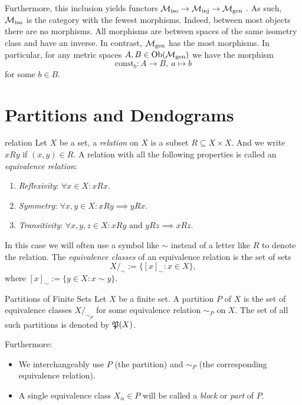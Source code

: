 Furthermore, this inclusion yields functors $\iso \to \inj \to \gen$ \cite[Def.~1.2.18]{Leinster2014-dc}.
As such, $\iso$ is the category with the fewest morphisms. Indeed, between most objects there are no morphisms.
All morphisms are between spaces of the same isometry class and have an inverse.
In contrast, $\gen$ has the most morphisms. In particular, for any metric spaces $A,B \in \ob(\gen)$ we have the morphism
$$
\mathrm{const}_b: A \to B, \ a \mapsto b
$$
for some $b \in B$.

\section{Partitions and Dendograms}
\label{section__partitions}

\begin{definition}{}{relation}
    Let $X$ be a set, a \emph{relation} on $X$ is a subset $R \subseteq X \times X$. And we write $x R y$ if $(x,y) \in R$.
    A relation with all the following properties is called an \emph{equivalence relation}:
    \begin{enumerate}
        \item \emph{Reflexivity}: $\forall x \in X: x R x$.
        \item \emph{Symmetry}: $\forall x,y \in X: x R y \implies y R x$.
        \item \emph{Transitivity}: $\forall x,y,z \in X: x R y \text{ and } y R z \implies x R z$.
    \end{enumerate}
    In this case we will often use a symbol like $\sim$ instead of a letter like $R$ to denote the relation. The \emph{equivalence classes} of an equivalence relation is the set of sets
    $$
    X/_{\sim} := \{[x]_\sim: x \in X\},
    $$
    where $[x]_\sim := \{y \in X: x \sim y\}$.
\end{definition}

\begin{definition}{Partitions of Finite Sets}{}
Let $X$ be a finite set. A partition $P$ of $X$ is the set of equivalence classes $X/_{\sim_P}$ for some equivalence relation $\sim_P$ on $X$. The set of all such partitions is denoted by $\P(X)$.\par

\medskip Furthermore:
\begin{itemize}
    \item We interchangeably use $P$ (the partition) and $\sim_P$ (the corresponding equivalence relation).
    \item A single equivalence class $X_\alpha \in P$ will be called a \emph{block} or \emph{part} of $P$.
\end{itemize}
\end{definition}

